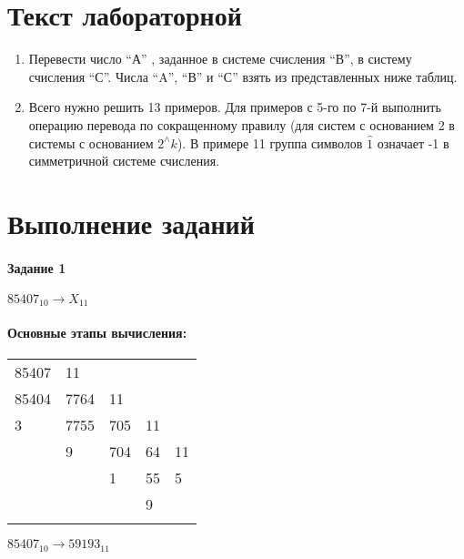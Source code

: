 \section{Текст лабораторной}
\begin{enumerate} 
\item Перевести число  ``А'' , заданное в системе счисления ``В'', в систему счисления ``С''. Числа ``A'', ``В'' и ``С'' взять из представленных ниже таблиц.
\item Всего нужно решить 13 примеров. Для примеров с 5-го по 7-й выполнить операцию перевода по сокращенному правилу (для систем с основанием 2 в системы с основанием $2^\wedge k$). В примере 11 группа символов ${\widehat{1}}$ означает -1 в симметричной системе счисления.
\end{enumerate}
\section{Выполнение заданий}
\paragraph{Задание 1}


$85407_{10} \rightarrow X_{11}$


\paragraph{Основные этапы вычисления:}
\hfill \break

\FloatBarrier
\begin{table}[h]
\centering
\begin{tabular}{lllll}
\multicolumn{1}{l|}{85407} & 11                        &                          &                         &     \\ 
\cline{2-2}
\multicolumn{1}{l|}{85404} & \multicolumn{1}{l|}{7764} & 11                       &                         &     \\ 
\cline{1-1}\cline{3-3}
3                          & \multicolumn{1}{l|}{7755} & \multicolumn{1}{l|}{705} & 11                      &     \\ 
\cline{2-2}\cline{4-4}
                           & 9                         & \multicolumn{1}{l|}{704} & \multicolumn{1}{l|}{64} & 11  \\ 
\cline{3-3}\cline{5-5}
                           &                           & 1                        & \multicolumn{1}{l|}{55} & 5   \\ 
\cline{4-4}
                           &                           &                          & 9                       &     \\
                           &                           &                          &                         &    
\end{tabular}
\end{table}
\FloatBarrier
$85407_{10} \rightarrow 59193_{11}$
